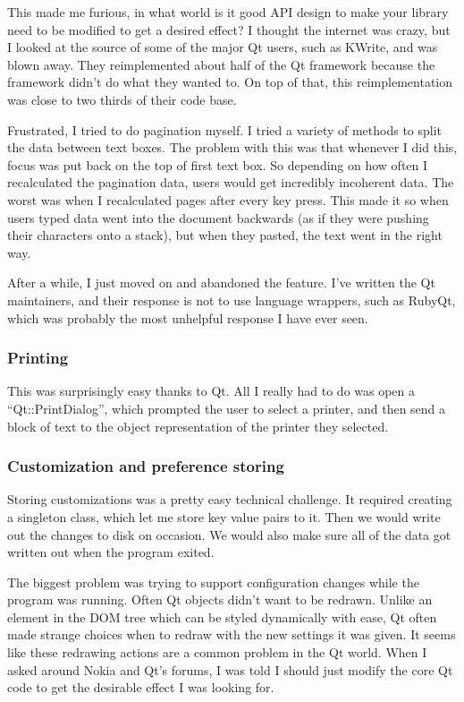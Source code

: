 \documentclass[10pt]{article}
\begin{document}
This made me furious, in what world is it good API design to make your library need to be modified to get a desired effect? I thought the internet was crazy, but I looked at the source of some of the major Qt users, such as KWrite, and was blown away. They reimplemented about half of the Qt framework because the framework didn't do what they wanted to. On top of that, this reimplementation was close to two thirds of their code base.

Frustrated, I tried to do pagination myself. I tried a variety of methods to split the data between text boxes. The problem with this was that whenever I did this, focus was put back on the top of first text box. So depending on how often I recalculated the pagination data, users would get incredibly incoherent data. The worst was when I recalculated pages after every key press. This made it so when users typed data went into the document backwards (as if they were pushing their characters onto a stack), but when they pasted, the text went in the right way.

After a while, I just moved on and abandoned the feature. I've written the Qt maintainers, and their response is not to use language wrappers, such as RubyQt, which was probably the most unhelpful response I have ever seen.

\subsubsection{Printing}

This was surprisingly easy thanks to Qt. All I really had to do was open a ``Qt::PrintDialog'', which prompted the user to select a printer, and then send a block of text to the object representation of the printer they selected.

\subsubsection{Customization and preference storing}

Storing customizations was a pretty easy technical challenge. It required creating a singleton class, which let me store key value pairs to it. Then we would write out the changes to disk on occasion. We would also make sure all of the data got written out when the program exited.

The biggest problem was trying to support configuration changes while the program was running. Often Qt objects didn't want to be redrawn. Unlike an element in the DOM tree which can be styled dynamically with ease, Qt often made strange choices when to redraw with the new settings it was given. It seems like these redrawing actions are a common problem in the Qt world. When I asked around Nokia and Qt's forums, I was told I should just modify the core Qt code to get the desirable effect I was looking for.
\end{document}
